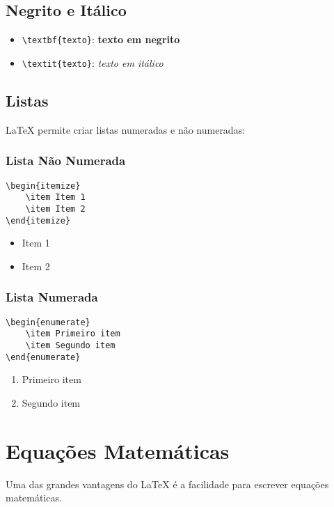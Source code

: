 \begin{apendicesenv}
\subsection*{Negrito e Itálico}
\begin{itemize}
    \item \texttt{\textbackslash textbf\{texto\}}: \textbf{texto em negrito}
    \item \texttt{\textbackslash textit\{texto\}}: \textit{texto em itálico}
\end{itemize}

\subsection*{Listas}
\LaTeX{} permite criar listas numeradas e não numeradas:

\subsubsection*{Lista Não Numerada}
\begin{verbatim}
\begin{itemize}
    \item Item 1
    \item Item 2
\end{itemize}
\end{verbatim}

\begin{itemize}
    \item Item 1
    \item Item 2
\end{itemize}

\subsubsection*{Lista Numerada}
\begin{verbatim}
\begin{enumerate}
    \item Primeiro item
    \item Segundo item
\end{enumerate}
\end{verbatim}

\begin{enumerate}
    \item Primeiro item
    \item Segundo item
\end{enumerate}

\section*{Equações Matemáticas}
Uma das grandes vantagens do \LaTeX{} é a facilidade para escrever equações matemáticas.


\end{apendicesenv}
